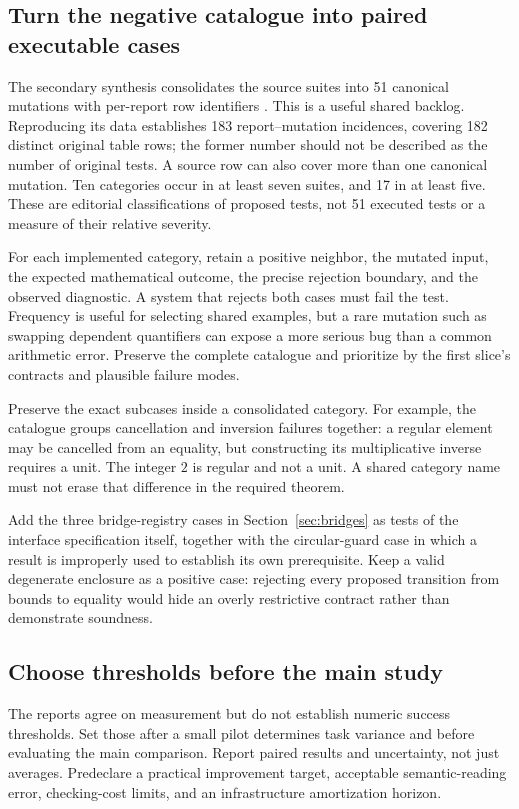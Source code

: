 \documentclass[11pt,letterpaper]{article}
\begin{document}
\subsection{Turn the negative catalogue into paired executable cases}
The secondary synthesis consolidates the source suites into 51 canonical
mutations with per-report row identifiers \cite[\S9.2]{secondary}. This is a
useful shared backlog. Reproducing its data establishes 183 report--mutation
incidences, covering 182 distinct original table rows; the former number should
not be described as the number of original tests. A source row can also cover
more than one canonical mutation. Ten categories occur in at least seven
suites, and 17 in at least five. These are editorial classifications of proposed
tests, not 51 executed tests or a measure of their relative severity.

For each implemented category, retain a positive neighbor, the mutated input,
the expected mathematical outcome, the precise rejection boundary, and the
observed diagnostic. A system that rejects both cases must fail the test.
Frequency is useful for selecting shared examples, but a rare mutation such as
swapping dependent quantifiers can expose a more serious bug than a common
arithmetic error. Preserve the complete catalogue and prioritize by the first
slice's contracts and plausible failure modes.

Preserve the exact subcases inside a consolidated category. For example, the
catalogue groups cancellation and inversion failures together: a regular element
may be cancelled from an equality, but constructing its multiplicative inverse
requires a unit. The integer \(2\) is regular and not a unit. A shared category
name must not erase that difference in the required theorem.

Add the three bridge-registry cases in Section~\ref{sec:bridges} as tests of the
interface specification itself, together with the circular-guard case in which
a result is improperly used to establish its own prerequisite. Keep a valid
degenerate enclosure as a positive case: rejecting every proposed transition
from bounds to equality would hide an overly restrictive contract rather than
demonstrate soundness.

\subsection{Choose thresholds before the main study}
The reports agree on measurement but do not establish numeric success thresholds.
Set those after a small pilot determines task variance and before evaluating
the main comparison. Report paired results and uncertainty, not just averages.
Predeclare a practical improvement target, acceptable semantic-reading error,
checking-cost limits, and an infrastructure amortization horizon.
\end{document}
